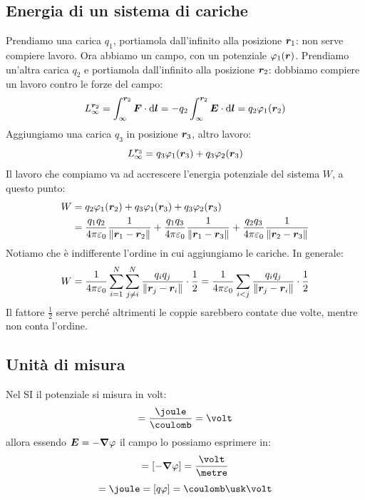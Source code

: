 \subsection{Energia di un sistema di cariche}
Prendiamo una carica $q_1$, portiamola dall'infinito alla posizione $\boldsymbol{r}_1$: non serve compiere lavoro. Ora abbiamo un campo, con un potenziale $\varphi_1(\boldsymbol{r})$. Prendiamo un'altra carica $q_2$ e portiamola dall'infinito alla posizione $\boldsymbol{r}_2$: dobbiamo compiere un lavoro contro le forze del campo:
\begin{equation*}L_\infty^{\boldsymbol{r}_2}=\int_\infty^{\boldsymbol{r}_2}\boldsymbol{F}\cdot\mathrm{d} \boldsymbol{l}=-q_2\int_\infty^{\boldsymbol{r}_2} \boldsymbol{E}\cdot\mathrm{d} \boldsymbol{l}=q_2\varphi_1(\boldsymbol{r}_2)\end{equation*}
Aggiungiamo una carica $q_3$ in posizione $\boldsymbol{r}_3$, altro lavoro:
\begin{equation*}L_\infty^{\boldsymbol{r}_3}=q_3\varphi_1(\boldsymbol{r}_3)+q_3\varphi_2(\boldsymbol{r}_3)\end{equation*}
Il lavoro che compiamo va ad accrescere l'energia potenziale del sistema $W$, a questo punto:
\begin{align*}
W&=q_2\varphi_1(\boldsymbol{r}_2)+q_3\varphi_1(\boldsymbol{r}_3)+q_3\varphi_2(\boldsymbol{r}_3)\\
&=\frac{q_1q_2}{4\pi\varepsilon_0}\frac{1}{\left\lVert\boldsymbol{r}_1-\boldsymbol{r}_2\right\rVert}+\frac{q_1q_3}{4\pi\varepsilon_0}\frac{1}{\left\lVert\boldsymbol{r}_1-\boldsymbol{r}_3\right\rVert}+
\frac{q_2q_3}{4\pi\varepsilon_0}\frac{1}{\left\lVert\boldsymbol{r}_2-\boldsymbol{r}_3\right\rVert}
\end{align*}
Notiamo che è indifferente l'ordine in cui aggiungiamo le cariche. In generale:
\begin{equation}
W=\frac{1}{4\pi\varepsilon_0}\sum_{i=1}^{N}\sum_{j\neq i}^{N}\frac{q_iq_j}{\left\lVert\boldsymbol{r}_j-\boldsymbol{r}_i\right\rVert}\cdot\frac{1}{2}=\frac{1}{4\pi\varepsilon_0}\sum_{i<j}\frac{q_iq_j}{\left\lVert\boldsymbol{r}_j-\boldsymbol{r}_i\right\rVert}\cdot\frac{1}{2}
\label{energia_sistema_cariche}
\end{equation}
Il fattore $\frac{1}{2}$ serve perché altrimenti le coppie sarebbero contate due volte, mentre non conta l'ordine.
\subsection{Unità di misura}
Nel SI il potenziale si misura in volt:
\begin{equation*}[\varphi]=\frac{\joule}{\coulomb}=\volt\end{equation*}
allora essendo $\boldsymbol{E}=-\boldsymbol{\nabla}\varphi$ il campo lo possiamo esprimere in:
\begin{equation*}[\ve E]=[-\ve\nabla\varphi]=\frac{\volt}{\metre}\end{equation*}
\begin{equation*}[U]=\joule=[q\varphi]=\coulomb\usk\volt\end{equation*}
